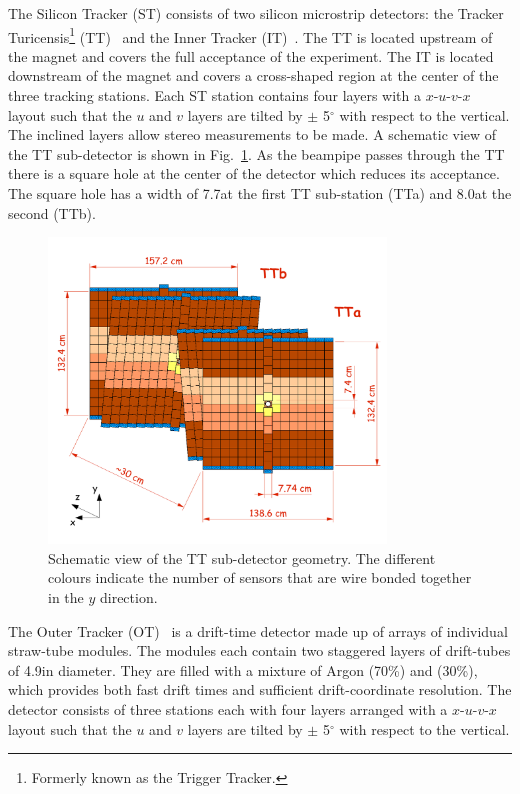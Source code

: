 The Silicon Tracker (ST) consists of two silicon microstrip detectors: the Tracker Turicensis\footnote{Formerly known as the Trigger Tracker.} (TT)~\cite{LHCb-TDR-009} and the Inner Tracker (IT)~\cite{LHCb-TDR-008}. The TT is located upstream of the magnet and covers the full acceptance of the experiment. The IT is located downstream of the magnet and covers a cross-shaped region at the center of the three tracking stations. Each ST station contains four layers with a \mbox{$x$-$u$-$v$-$x$} layout such that the $u$ and $v$ layers are tilted by $\pm$ 5$^{\circ}$ with respect to the vertical. The inclined layers allow stereo measurements to be made. A schematic view of the TT sub-detector is shown in Fig.~\ref{fig:tt}. As the beampipe passes through the TT there is a square hole at the center of the detector which reduces its acceptance. The square hole has a width of 7.7\cm at the first TT sub-station (TTa) and 8.0\cm at the second (TTb).

\begin{figure}[!tb]
\centering
\includegraphics[width=0.8\textwidth]{figs/detector/tt.pdf}
\caption{Schematic view of the TT sub-detector geometry. The different colours indicate the number of sensors that are wire bonded together in the $y$ direction.}
\label{fig:tt}
\end{figure}

The Outer Tracker (OT)~\cite{LHCb-TDR-006,LHCb-DP-2013-003} is a drift-time detector made up of arrays of individual straw-tube modules. The modules each contain two staggered layers of drift-tubes of 4.9\mm in diameter. They are filled with a mixture of Argon (70\%) and \cotwo (30\%), which provides both fast drift times and sufficient drift-coordinate resolution. The detector consists of three stations each with four layers arranged with a \mbox{$x$-$u$-$v$-$x$} layout such that the $u$ and $v$ layers are tilted by $\pm$ 5$^{\circ}$ with respect to the vertical.

